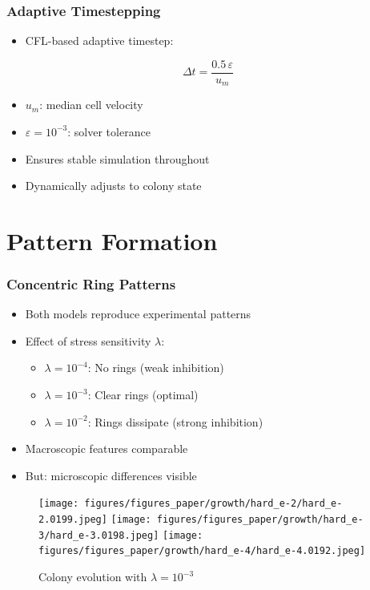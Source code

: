 \documentclass[
	10pt,
	t
]{beamer}
\begin{document}
\begin{frame}
    \frametitle{Adaptive Timestepping}

    \begin{itemize}
        \item CFL-based adaptive timestep:
    \end{itemize}

    \begin{equation*}
        \Delta t = \frac{0.5 \, \varepsilon}{u_m}
    \end{equation*}

    \begin{itemize}
        \item $u_m$: median cell velocity
        \item $\varepsilon = 10^{-3}$: solver tolerance
        \item Ensures stable simulation throughout
        \item Dynamically adjusts to colony state
    \end{itemize}

\end{frame}

\section{Pattern Formation}

\begin{frame}
    \frametitle{Concentric Ring Patterns}

    \begin{itemize}
        \item Both models reproduce experimental patterns
        \item Effect of stress sensitivity $\lambda$:
              \begin{itemize}
                  \item $\lambda = 10^{-4}$: No rings (weak inhibition)
                  \item $\lambda = 10^{-3}$: Clear rings (optimal)
                  \item $\lambda = 10^{-2}$: Rings dissipate (strong inhibition)
              \end{itemize}
        \item Macroscopic features comparable
        \item But: microscopic differences visible
    \end{itemize}

    \vspace{0.2cm}

    \begin{figure}
        \centering
        \texttt{[image: figures/figures\_paper/growth/hard\_e-2/hard\_e-2.0199.jpeg]}
        \texttt{[image: figures/figures\_paper/growth/hard\_e-3/hard\_e-3.0198.jpeg]}
        \texttt{[image: figures/figures\_paper/growth/hard\_e-4/hard\_e-4.0192.jpeg]}
        \caption{\scriptsize{Colony evolution with $\lambda = 10^{-3}$}}
    \end{figure}

\end{frame}
\end{document}

